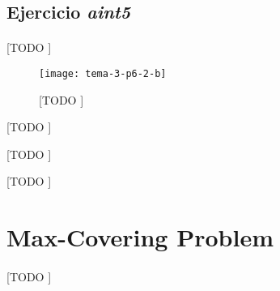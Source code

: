 \documentclass[spanish]{article}
\begin{document}
		\subsection{Ejercicio \emph{aint5}}
		\label{sec:e-6.2b}

			\paragraph{}
			[TODO ]

			\begin{figure}[h]
				\begin{center}
					\texttt{[image: tema-3-p6-2-b]}
				\end{center}
				\caption{[TODO ]}
				\label{}
			\end{figure}

			\begin{table}[h]
				\begin{center}
				\end{center}
				\caption{[TODO ]}
				\label{}
			\end{table}

			\begin{table}[h]
				\begin{center}
				\end{center}
				\caption{[TODO ]}
				\label{}
			\end{table}

			\begin{table}[h]
				\begin{center}
				\end{center}
				\caption{[TODO ]}
				\label{}
			\end{table}

	\section{Max-Covering Problem}
	\label{sec:e-7}

		\paragraph{}
		[TODO ]
\end{document}
